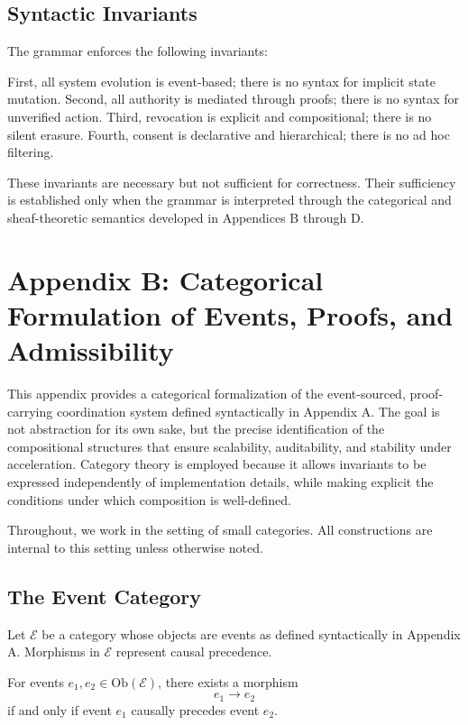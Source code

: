 \documentclass[11pt,oneside]{article}
\begin{document}
\subsection{Syntactic Invariants}

The grammar enforces the following invariants:

First, all system evolution is event-based; there is no syntax for implicit state mutation.  
Second, all authority is mediated through proofs; there is no syntax for unverified action.  
Third, revocation is explicit and compositional; there is no silent erasure.  
Fourth, consent is declarative and hierarchical; there is no ad hoc filtering.

These invariants are necessary but not sufficient for correctness. Their sufficiency is established only when the grammar is interpreted through the categorical and sheaf-theoretic semantics developed in Appendices B through D.

\section{Appendix B: Categorical Formulation of Events, Proofs, and Admissibility}

This appendix provides a categorical formalization of the event-sourced, proof-carrying coordination system defined syntactically in Appendix A. The goal is not abstraction for its own sake, but the precise identification of the compositional structures that ensure scalability, auditability, and stability under acceleration. Category theory is employed because it allows invariants to be expressed independently of implementation details, while making explicit the conditions under which composition is well-defined.

Throughout, we work in the setting of small categories. All constructions are internal to this setting unless otherwise noted.

\subsection{The Event Category}

Let \( \mathcal{E} \) be a category whose objects are events as defined syntactically in Appendix A. Morphisms in \( \mathcal{E} \) represent causal precedence.

For events \( e_1, e_2 \in \mathrm{Ob}(\mathcal{E}) \), there exists a morphism
\[
e_1 \to e_2
\]
if and only if event \( e_1 \) causally precedes event \( e_2 \).
\end{document}
